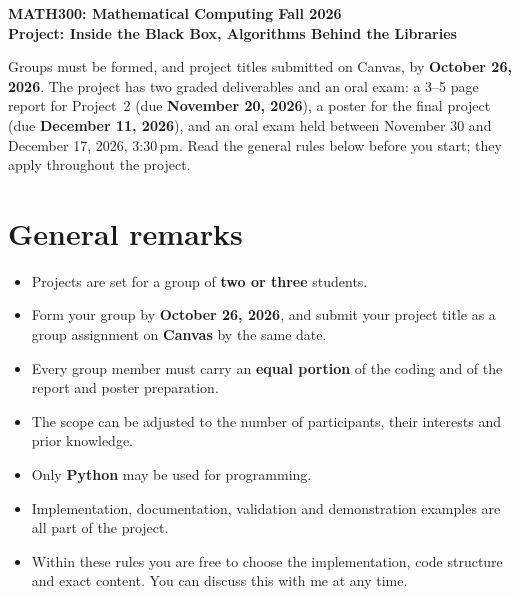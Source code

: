 \documentclass[11pt,a4paper]{article}
\begin{document}
\begin{center}
  {\large\bfseries MATH300: Mathematical Computing \textperiodcentered{} Fall 2026}\\[6pt]
  {\Large\bfseries Project: Inside the Black Box, Algorithms Behind the Libraries}
\end{center}
\vspace{6pt}

Groups must be formed, and project titles submitted on Canvas, by
\textbf{October 26, 2026}. The project
has two graded deliverables and an oral exam: a 3--5 page report for
Project~2 (due \textbf{November 20, 2026}), a poster for the final project
(due \textbf{December 11, 2026}), and an oral exam held between November 30
and December 17, 2026, 3:30\,pm. Read the general rules below before you
start; they apply throughout the project.

\section*{General remarks}
\begin{itemize}
  \item Projects are set for a group of \textbf{two or three} students.
  \item Form your group by \textbf{October 26, 2026}, and submit your
        project title as a group assignment on \textbf{Canvas} by the same
        date.
  \item Every group member must carry an \textbf{equal portion} of the coding
        and of the report and poster preparation.
  \item The scope can be adjusted to the number of participants, their
        interests and prior knowledge.
  \item Only \textbf{Python} may be used for programming.
  \item Implementation, documentation, validation and demonstration examples
        are all part of the project.
  \item Within these rules you are free to choose the implementation, code
        structure and exact content. You can discuss this with me at any time.
\end{itemize}
\end{document}

